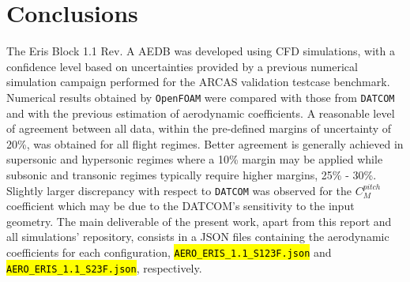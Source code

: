 \documentclass[12pt]{article}
\begin{document}
%
%
%

\section{Conclusions}\label{sec:conclusions}
The Eris Block 1.1 Rev. A AEDB was developed using CFD simulations, with a confidence level based on uncertainties provided by a previous numerical simulation campaign performed for the ARCAS validation testcase benchmark. Numerical results obtained by \texttt{OpenFOAM} were compared with those from \texttt{DATCOM} and with the previous estimation of aerodynamic coefficients. A reasonable level of agreement between all data, within the pre-defined margins of uncertainty of 20\%, was obtained for all flight regimes. Better agreement is generally achieved in supersonic and hypersonic regimes where a 10\% margin may be applied while subsonic and transonic regimes typically require higher margins, 25\% - 30\%. Slightly larger discrepancy with respect to \texttt{DATCOM} was observed for the $C_{M}^{pitch}$ coefficient which may be due to the DATCOM's sensitivity to the input geometry. The main deliverable of the present work, apart from this report and all simulations' repository, consists in a JSON files containing the aerodynamic coefficients for each configuration, \texttt{\hl{AERO\_ERIS\_1.1\_S123F.json}} and \texttt{\hl{AERO\_ERIS\_1.1\_S23F.json}}, respectively.
\end{document}
